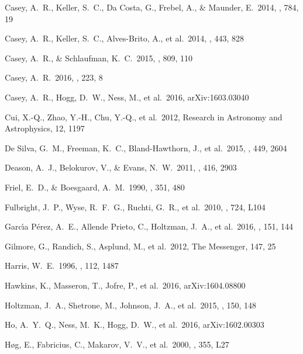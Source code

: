 \documentclass[preprint,trackchanges]{aastex}
\begin{document}
\begin{thebibliography}{dummy}
 Casey, A.~R., Keller, S.~C., Da Costa, G., Frebel, A., \& Maunder, E.\ 2014, \apj, 784, 19 

 Casey, A.~R., Keller, S.~C., Alves-Brito, A., et al.\ 2014, \mnras, 443, 828 

 Casey, A.~R., \& Schlaufman, K.~C.\ 2015, \apj, 809, 110 

 Casey, A.~R.\ 2016, \apjs, 223, 8 

 Casey, A.~R., Hogg, D.~W., Ness, M., et al.\ 2016, arXiv:1603.03040 

 Cui, X.-Q., Zhao, Y.-H., Chu, Y.-Q., et al.\ 2012, Research in Astronomy and Astrophysics, 12, 1197 

 De Silva, G.~M., Freeman, K.~C., Bland-Hawthorn, J., et al.\ 2015, \mnras, 449, 2604 

 Deason, A.~J., Belokurov, V., \& Evans, N.~W.\ 2011, \mnras, 416, 2903 

 Friel, E.~D., \& Boesgaard, A.~M.\ 1990, \apj, 351, 480 

 Fulbright, J.~P., Wyse, R.~F.~G., Ruchti, G.~R., et al.\ 2010, \apjl, 724, L104 

 Garc{\'{\i}}a P{\'e}rez, A.~E., Allende Prieto, C., Holtzman, J.~A., et al.\ 2016, \aj, 151, 144 

 Gilmore, G., Randich, S., Asplund, M., et al.\ 2012, The Messenger, 147, 25

 Harris, W.~E.\ 1996, \aj, 112, 1487 

 Hawkins, K., Masseron, T., Jofre, P., et al.\ 2016, arXiv:1604.08800 

 Holtzman, J.~A., Shetrone, M., Johnson, J.~A., et al.\ 2015, \aj, 150, 148 

 Ho, A.~Y.~Q., Ness, M.~K., Hogg, D.~W., et al.\ 2016, arXiv:1602.00303 
 
 H{\o}g, E., Fabricius, C., Makarov, V.~V., et al.\ 2000, \aap, 355, L27 


\end{thebibliography}
\end{document}
